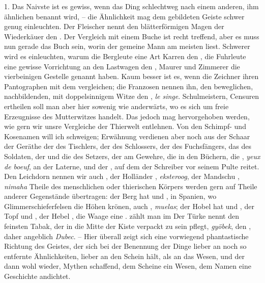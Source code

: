 1. Das Naivste ist es gewiss, wenn das Ding schlechtweg nach einem anderen, ihm ähnlichen benannt wird, – die Ähnlichkeit mag dem gebildeten Geiste schwer genug einleuchten. Der Fleischer nennt den blätterförmigen Magen der Wiederkäuer den . Der Vergleich mit einem Buche ist recht treffend, aber es muss nun gerade das Buch sein, worin der gemeine Mann am meisten liest. Schwerer wird es einleuchten, warum die Bergleute \label{sp.41} eine Art Karren den , die Fuhrleute eine gewisse Vorrichtung an den Lastwagen den , Maurer und Zimmerer die vierbeinigen Gestelle  genannt haben. Kaum besser ist es, wenn die Zeichner ihren Pantographen mit dem  vergleichen; die Franzosen nennen ihn, den beweglichen, nachbildenden, mit doppelsinnigem Witze den , \textit{le singe}. Schulmeistern, Censuren ertheilen soll man aber hier sowenig wie anderwärts, wo es sich um freie Erzeugnisse des Mutterwitzes handelt. Das \label{fp.41} jedoch mag hervorgehoben werden, wie gern wir unsre Vergleiche der Thierwelt entlehnen. Von den Schimpf- und Kosenamen will ich schweigen; Erwähnung verdienen aber noch aus der Schaar der Geräthe der  des Tischlers, der  des Schlossers, der  des Fuchsfängers, das  des Soldaten, der  und die  des Setzers, der  am Gewehre, die  in den Büchern, die , \textit{yeux de boeuf}, an der Laterne, und der , auf dem der Schreiber vor seinem Pulte reitet. Den Leichdorn nennen wir auch ,  der Holländer , \textit{eksteroog}, der Mandschu , \textit{nimaha}   Theile des menschlichen oder thierischen Körpers werden gern auf Theile anderer Gegenstände übertragen: der Berg hat  und , in Spanien, wo Glimmerschieferfelsen die Höhen krönen, auch , \textit{muelas}; der Hobel hat  und , der Topf  und , der Hebel , die Waage eine .  zählt man im  Der Türke nennt den feinsten Tabak, der in die Mitte der Kiste verpackt zu sein pflegt, \textit{gyöbek}, den , daher angeblich \textit{Dubec}. – Hier überall zeigt sich eine vorwiegend phantastische Richtung des Geistes, der sich bei der Benennung der Dinge lieber an noch so entfernte Ähnlichkeiten, lieber an den Schein hält, als an das Wesen, und der dann wohl wieder, Mythen schaffend, dem Scheine ein Wesen, dem Namen eine Geschichte andichtet.

